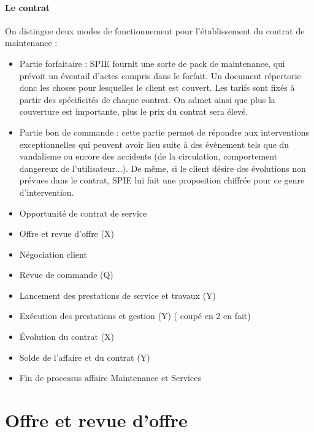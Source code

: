 \paragraph{Le contrat}

On distingue deux modes de fonctionnement pour l’établissement du contrat de maintenance :

\begin{itemize}
\item Partie forfaitaire : SPIE fournit une sorte de pack de maintenance, qui prévoit un éventail d’actes compris dans le forfait. Un document répertorie donc les choses pour lesquelles le client est couvert. Les tarifs sont fixés à partir des spécificités de chaque contrat. On admet ainsi que plus la couverture est importante, plus le prix du contrat sera élevé. 
\item Partie bon de commande : cette partie permet de répondre aux interventions exceptionnelles qui peuvent avoir lieu suite à des évènement tels que du vandalisme ou encore des accidents (de la circulation, comportement dangereux de l’utilisateur...). De même, si le client désire des évolutions non prévues dans le contrat, SPIE lui fait une proposition chiffrée pour ce genre d’intervention.
\end{itemize}


\begin{itemize}
\item Opportunité de contrat de service
\item Offre et revue d’offre (X)
\item Négociation client 
\item Revue de commande (Q)
\item Lancement des prestations de service et travaux (Y)
\item Exécution des prestations et gestion (Y) ( coupé en 2 en fait)
\item Évolution du contrat (X)
\item Solde de l’affaire et du contrat (Y)
\item Fin de processus affaire Maintenance et Services
\end{itemize}

\section{Offre et revue d’offre}

